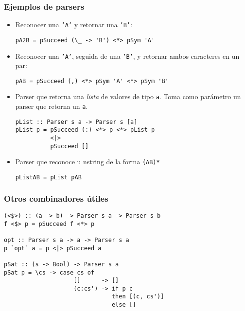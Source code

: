 \documentclass{article}
\begin{document}
\subsubsection{Ejemplos de parsers}

\begin{itemize}
\item Reconocer una \texttt{'A'} y retornar una \texttt{'B'}:
\begin{lstlisting}
pA2B = pSucceed (\_ -> 'B') <*> pSym 'A'
\end{lstlisting}
\item Reconocer una \texttt{'A'}, seguida de una \texttt{'B'}, y retornar ambos caracteres en un par:
\begin{lstlisting}
pAB = pSucceed (,) <*> pSym 'A' <*> pSym 'B'
\end{lstlisting}
\item Parser que retorna una \emph{lista} de valores de tipo \texttt{a}. Toma como parámetro un parser que retorna un \texttt{a}.
\begin{lstlisting}
pList :: Parser s a -> Parser s [a]
pList p = pSucceed (:) <*> p <*> pList p
          <|>
          pSucceed []
\end{lstlisting}
\item Parser que reconoce u nstring de la forma \texttt{(AB)*}
\begin{lstlisting}
pListAB = pList pAB
\end{lstlisting}
\end{itemize}

\subsubsection{Otros combinadores útiles}

\begin{lstlisting}
(<$>) :: (a -> b) -> Parser s a -> Parser s b
f <$> p = pSucceed f <*> p

opt :: Parser s a -> a -> Parser s a
p `opt` a = p <|> pSucceed a

pSat :: (s -> Bool) -> Parser s a
pSat p = \cs -> case cs of
                    []      -> []
                    (c:cs') -> if p c
                               then [(c, cs')] 
                               else []
\end{lstlisting}
\end{document}
